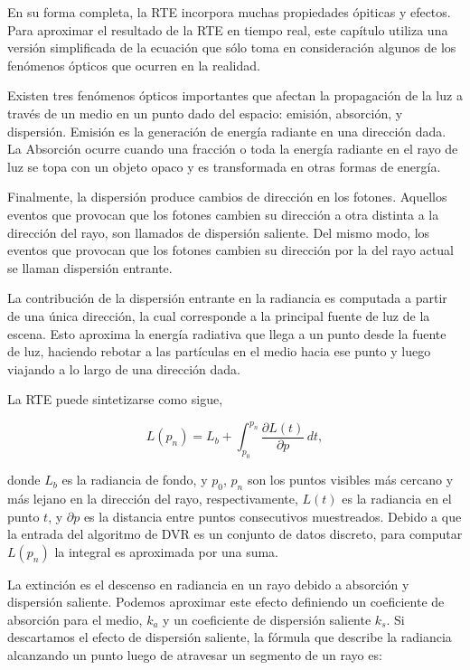 En su forma completa, la RTE incorpora muchas propiedades ópiticas y efectos.
Para aproximar el resultado de la RTE en tiempo real, este capítulo utiliza una versión simplificada de la ecuación que sólo toma en consideración algunos de los fenómenos ópticos que ocurren en la realidad.

Existen tres fenómenos ópticos importantes que afectan la propagación de la luz a través de un medio en un punto dado del espacio: emisión, absorción, y dispersión.
Emisión es la generación de energía radiante en una dirección dada.
La Absorción ocurre cuando una fracción o toda la energía radiante en el rayo de luz se topa con un objeto opaco y es transformada en otras formas de energía.

Finalmente, la dispersión produce cambios de dirección en los fotones.
Aquellos eventos que provocan que los fotones cambien su dirección a otra distinta a la dirección del rayo, son llamados de dispersión saliente. Del mismo modo, los eventos que provocan que los fotones cambien su dirección por la del rayo actual se llaman dispersión entrante.

%
La contribución de la dispersión entrante en la radiancia es computada a partir de una única dirección, la cual corresponde a la principal fuente de luz de la escena.
Esto aproxima la energía radiativa que llega a un punto desde la fuente de luz, haciendo rebotar a las partículas en el medio hacia ese punto y luego viajando a lo largo de una dirección dada. 

La RTE puede sintetizarse como sigue,

\begin{equation} \label{eq:general_radiance}  
  L(p_n) = L_b + \int_{p_0}^{p_n} \frac{\partial L(t)}{\partial p} \, dt,
\end{equation}

\noindent donde $L_b$ es la radiancia de fondo, y $p_0$, $p_n$ son los puntos visibles más cercano y más lejano en la dirección del rayo, respectivamente, $L(t)$  es la radiancia en el punto $t$, y $\partial p$ es la distancia entre puntos consecutivos muestreados. 
Debido a que la entrada del algoritmo de DVR es un conjunto de datos discreto, para computar $L(p_n)$ la integral es aproximada por una suma.

La extinción es el descenso en radiancia en un rayo debido a absorción y dispersión saliente.
Podemos aproximar este efecto definiendo un coeficiente de absorción para el medio, $k_a$ y un coeficiente de dispersión saliente $k_s$. 
Si descartamos el efecto de dispersión saliente, la fórmula que describe la radiancia alcanzando un punto luego de atravesar un segmento de un rayo es:

